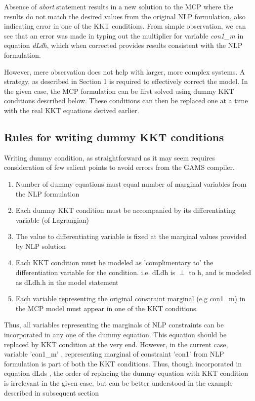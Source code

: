 \documentclass{article}
\begin{document}



\noindent Absence of \textit{abort} statement results in a new solution to the MCP where the results do not match the desired values from the original NLP formulation, also indicating error in one of the KKT conditions. From simple observation, we can see that an error was made in typing out the multiplier for variable \textit{con1\_m} in equation \textit{dLdh}, which when corrected provides results consistent with the NLP formulation. 

However, mere observation does not help with larger, more complex  systems. A strategy, as described in Section 1 is required to effectively correct the model. In the given case, the MCP formulation can be first solved using dummy KKT conditions described below. These conditions can then be replaced one at a time with the real KKT equations derived earlier. 



\subsection{Rules for writing dummy KKT conditions}

Writing dummy condition, as straightforward as it may seem requires consideration of few salient points to avoid errors from the GAMS compiler.

\begin{enumerate}
	\item Number of dummy equations must equal number of marginal variables from the NLP formulation
	\item Each dummy KKT condition must be accompanied by its differentiating variable (of Lagrangian) 
	\item The value to differentiating variable is fixed at the marginal values provided by NLP solution
	\item Each KKT condition must be modeled as 'complimentary to' the differentiation variable for the condition. i.e. dLdh is $\perp$ to h, and is modeled as dLdh.h in the model statement
	\item Each variable representing the original constraint marginal (e.g con1\_m) in the MCP model must appear in one of the KKT conditions. 
	
\end{enumerate}

Thus, all variables representing the marginals of NLP constraints can be incorporated in any one of the dummy equation. This equation should be replaced by KKT condition at the very end. However, in the current case, variable 'con1\_m' , representing marginal of constraint 'con1' from NLP formulation is part of both the KKT conditions. Thus, though incorporated in equation dLds , the order of replacing the dummy equation with KKT condition is irrelevant in the given case, but can be better understood in the example described in subsequent section
\end{document}
